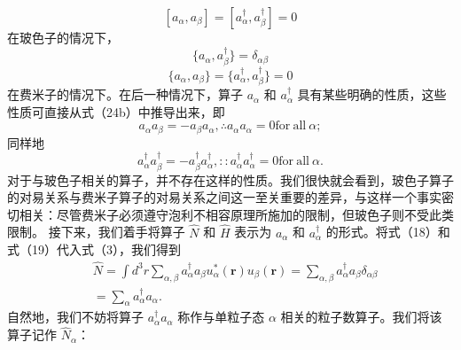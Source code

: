 \begin{equation}\tag{11.1.30}\label{eq:11.1.30}
[ a _ { \alpha } , a _ { \beta } ] = [ a _ { \alpha } ^{\dagger} , a _ { \beta } ^{\dagger} ] = 0
\end{equation}
在玻色子的情况下，
\begin{equation}\tag{11.1.31}\label{eq:11.1.31}
\{ a _ { \alpha } , a _ { \beta } ^{\dagger} \} = \delta _ { \alpha \beta }
\end{equation}
\begin{equation}\tag{11.1.32}\label{eq:11.1.32}
\{ a _ { \alpha } , a _ { \beta } \} = \{ a _ { \alpha } ^{\dagger} , a _ { \beta } ^{\dagger} \} = 0
\end{equation}
在费米子的情况下。在后一种情况下，算子 \(a_{\alpha}\) 和 \(a_{\alpha}^{\dagger}\) 具有某些明确的性质，这些性质可直接从式（24b）中推导出来，即
\begin{equation}\tag{11.1.33}\label{eq:11.1.33}
a _ { \alpha } a _ { \beta } = - a _ { \beta } a _ { \alpha } ,  \therefore a _ { \alpha } a _ { \alpha } = 0  { \mathrm { f o r ~ a l l ~ } } \alpha ;
\end{equation}
同样地
\begin{equation}\tag{11.1.34}\label{eq:11.1.34}
a _ { \alpha } ^{\dagger} a _ { \beta } ^{\dagger} = - a _ { \beta } ^{\dagger} a _ { \alpha } ^{\dagger} ,  : : a _ { \alpha } ^{\dagger} a _ { \alpha } ^{\dagger} = 0  \mathrm { f o r ~ a l l ~ } \alpha .
\end{equation}
对于与玻色子相关的算子，并不存在这样的性质。我们很快就会看到，玻色子算子的对易关系与费米子算子的对易关系之间这一至关重要的差异，与这样一个事实密切相关：尽管费米子必须遵守泡利不相容原理所施加的限制，但玻色子则不受此类限制。
接下来，我们着手将算子 \(\hat{N}\) 和 \(\hat{H}\) 表示为 \(a_{\alpha}\) 和 \(a_{\alpha}^{\dagger}\) 的形式。将式（18）和式（19）代入式（3），我们得到
\begin{equation}\tag{11.1.35}\label{eq:11.1.35}
\begin{array}{rl} & { \hat { N } = \int d ^{3} r \sum _ { \alpha , \beta } a _ { \alpha } ^{\dagger} a _ { \beta } u _ { \alpha } ^{*} ( \boldsymbol { r } ) u _ { \beta } ( \boldsymbol { r } ) = \sum _ { \alpha , \beta } a _ { \alpha } ^{\dagger} a _ { \beta } \delta _ { \alpha \beta } } \\& { = \sum _ { \alpha } a _ { \alpha } ^{\dagger} a _ { \alpha } . } \end{array}
\end{equation}
自然地，我们不妨将算子 \(a_{\alpha}^{\dagger}a_{\alpha}\) 称作与单粒子态 \(\alpha\) 相关的粒子数算子。我们将该算子记作 \(\hat{N}_{\alpha}\)：
